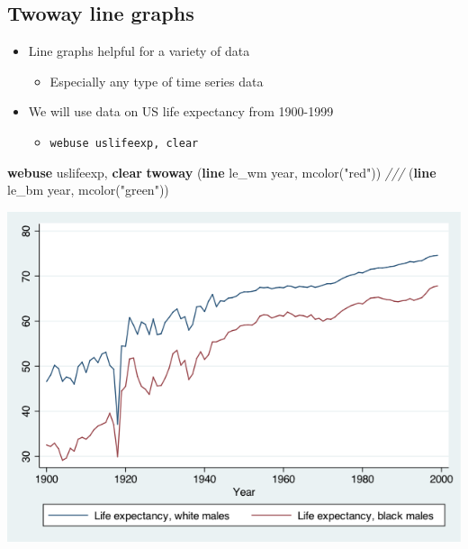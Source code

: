 \documentclass[
]{book}
\newenvironment{Shaded}{\begin{snugshade}}{\end{snugshade}}
\newcommand{\CommentTok}[1]{\textcolor[rgb]{0.56,0.35,0.01}{\textit{#1}}}
\newcommand{\FunctionTok}[1]{\textcolor[rgb]{0.00,0.00,0.00}{#1}}
\newcommand{\KeywordTok}[1]{\textcolor[rgb]{0.13,0.29,0.53}{\textbf{#1}}}
\newcommand{\NormalTok}[1]{#1}
\newcommand{\StringTok}[1]{\textcolor[rgb]{0.31,0.60,0.02}{#1}}
\providecommand{\tightlist}{%
  \setlength{\itemsep}{0pt}\setlength{\parskip}{0pt}}
\begin{document}
\hypertarget{twoway-line-graphs}{%
\subsection{Twoway line graphs}\label{twoway-line-graphs}}

\begin{itemize}
\tightlist
\item
  Line graphs helpful for a variety of data

  \begin{itemize}
  \tightlist
  \item
    Especially any type of time series data
  \end{itemize}
\item
  We will use data on US life expectancy from 1900-1999

  \begin{itemize}
  \tightlist
  \item
    \texttt{webuse\ uslifeexp,\ clear}
  \end{itemize}
\end{itemize}

\begin{Shaded}
\begin{Highlighting}[]
\KeywordTok{webuse}\NormalTok{ uslifeexp, }\KeywordTok{clear}
\KeywordTok{twoway}\NormalTok{ (}\KeywordTok{line}\NormalTok{ le\_wm }\FunctionTok{year}\NormalTok{, mcolor(}\StringTok{"red"}\NormalTok{)) }\CommentTok{///}
\NormalTok{       (}\KeywordTok{line}\NormalTok{ le\_bm }\FunctionTok{year}\NormalTok{, mcolor(}\StringTok{"green"}\NormalTok{))}
\end{Highlighting}
\end{Shaded}

\includegraphics{Stata/StataGraphics/images/linegraph1.png}
\end{document}

